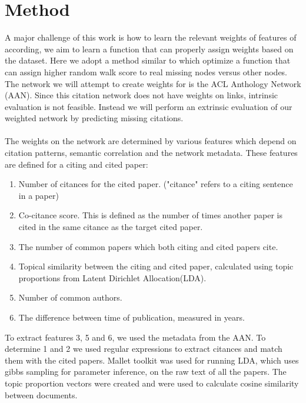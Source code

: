 \documentclass{article} %
\begin{document}
\section{Method}
A major challenge of this work is how to learn the relevant weights of features of according, we aim to learn a function that can properly assign weights based on the dataset. Here we adopt a method similar to \cite{Backstrom:2011:SRW:1935826.1935914} which optimize a function that can assign higher random walk score to real missing nodes versus other nodes.
The network we will attempt to create weights for is the ACL Anthology Network (AAN). Since this citation network does not have weights on links, intrinsic evaluation is not feasible. Instead we will perform an extrinsic evaluation of our weighted network by predicting missing citations.\\
\\
The weights on the network are determined by various features which depend on citation patterns, semantic correlation and the network metadata. These features are defined for a citing and cited paper:
\begin{enumerate}
  \item Number of citances for the cited paper. ("citance" refers to a citing sentence in a paper)
  \item Co-citance score. This is defined as the number of times another paper is cited in the same citance as the target cited paper.
  \item The number of common papers which both citing and cited papers cite.
  \item Topical similarity between the citing and cited paper, calculated using topic proportions from Latent Dirichlet Allocation(LDA).
  \item Number of common authors.
  \item The difference between time of publication, measured in years.
\end{enumerate}
To extract features 3, 5 and 6, we used the metadata from the AAN. To determine 1 and 2 we used regular expressions to extract citances and match them with the cited papers. Mallet toolkit was used for running LDA, which uses gibbs sampling for parameter inference, on the raw text of all the papers. The topic proportion vectors were created and were used to calculate cosine similarity between documents.
\end{document}
